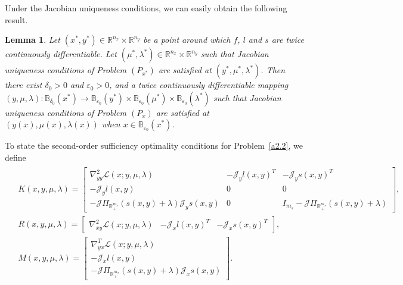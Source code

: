 \documentclass{article}
\newtheorem{lemma}{Lemma}
\begin{document}
	Under the Jacobian uniqueness conditions, we can easily obtain the following result.
	\begin{lemma}\label{lemma the suf}
		Let $(x^{\ast}, y^{\ast}) \in \mathbb{R}^{n_{x}}\times\mathbb{R}^{n_{y}}$ be a point around which $f$, $l$ and $s$ are twice continuously differentiable. Let $(\mu^{\ast}, \lambda^{\ast}) \in \mathbb{R}^{n_{x}}\times\mathbb{R}^{n_{y}}$ such that Jacobian uniqueness conditions of Problem $(P_{x^{\ast}})$ are satisfied at $(y^{\ast}, \mu^{\ast}, \lambda^{\ast})$. Then there exist $\delta_{0} > 0$ and $\varepsilon_{0} > 0$, and a twice continuously differentiable mapping $(y, \mu, \lambda) : \mathbb{B}_{\delta_{0}}(x^{\ast}) \rightarrow \mathbb{B}_{\varepsilon_{0}}(y^{\ast})\times\mathbb{B}_{\varepsilon_{0}}(\mu^{\ast})\times\mathbb{B}_{\varepsilon_{0}}(\lambda^{\ast})$ such that Jacobian uniqueness conditions of Problem $(P_{x})$ are satisfied at $(y(x), \mu(x), \lambda(x))$ when $x\in\mathbb{B}_{\varepsilon_{0}}(x^{\ast})$.
	\end{lemma}
	
	To state the second-order sufficiency optimality conditions for Problem~\eqref{a2.2}, we define
	\begin{align}\label{KRM}
		\begin{aligned}
			& K(x, y, \mu, \lambda) = \begin{bmatrix}
				\nabla_{yy}^{2} \mathcal{L}(x; y, \mu, \lambda) & -\mathcal{J}_{y}l(x, y)^{T} & -\mathcal{J}_{y}s(x, y)^{T}\\
				-\mathcal{J}_{y}l(x, y) & 0 & 0\\
				-\mathcal{J}\Pi_{\mathbb{R}_{+}^{m_{s}}}(s(x, y) + \lambda)\mathcal{J}_{y}s(x, y) & 0 & I_{m_{s}} - \mathcal{J}\Pi_{\mathbb{R}_{+}^{m_{s}}}(s(x, y) + \lambda)
			\end{bmatrix},\\
			& R(x, y, \mu, \lambda) = \begin{bmatrix}
				\nabla_{xy}^{2}\mathcal{L}(x; y, \mu, \lambda) & -\mathcal{J}_{x}l(x, y)^{T} & -\mathcal{J}_{x}s(x, y)^{T}
			\end{bmatrix},\\
			& M(x, y, \mu, \lambda) = \begin{bmatrix}
				\nabla_{yx}^{T}\mathcal{L}(x; y, \mu, \lambda)\\
				-\mathcal{J}_{x}l(x, y)\\
				-\mathcal{J}\Pi_{\mathbb{R}_{+}^{m_{s}}}(s(x, y) + \lambda)\mathcal{J}_{x}s(x, y)
			\end{bmatrix}.
		\end{aligned}
	\end{align}
	
\end{document}
